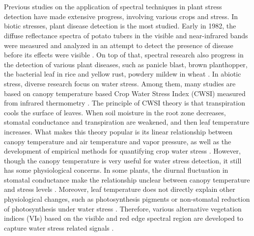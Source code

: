 \documentclass[12pt,a4paper]{article}
\begin{document}
\\
\\
Previous studies on the application of spectral techniques in plant stress detection have made extensive progress, involving various crops and stress. In biotic stresses, plant disease detection is the most studied. Early in 1982, the diffuse reflectance spectra of potato tubers in the visible and near-infrared bands were measured and analyzed in an attempt to detect the presence of disease before its effects were visible \citep{muir1982experiments}. On top of that, spectral research also progress in the detection of various plant diseases, such as panicle blast, brown planthopper, the bacterial leaf in rice \citep{kobayashi2001detection,prasannakumar2013assessment,yang2010assessment} and yellow rust, powdery mildew in wheat \citep{bravo2003early,cao2013detection}. In abiotic stress, diverse research focus on water stress. Among them, many studies are based on canopy temperature based Crop Water Stress Index (CWSI) measured from infrared thermometry \citep{alchanatis2010evaluation,aladenola2014response,bellvert2016airborne}. The principle of CWSI theory is that transpiration cools the surface of leaves. When soil moisture in the root zone decreases, stomatal conductance and transpiration are weakened, and then leaf temperature increases. What makes this theory popular is its linear relationship between canopy temperature and air temperature and vapor pressure, as well as the development of empirical methods for quantifying crop water stress \citep{idso1981normalizing}. However, though the canopy temperature is very useful for water stress detection, it still has some physiological concerns. In some plants, the diurnal fluctuation in stomatal conductance make the relationship unclear between canopy temperature and stress levels \citep{zarco2012fluorescence}. Moreover, leaf temperature does not directly explain other physiological changes, such as photosynthesis pigments or non-stomatal reduction of photosynthesis under water stress \citep{zarco2013pri}. Therefore, various alternative vegetation indices (VIs) based on the visible and red edge spectral region are developed to capture water stress related signals \citep{berni2009thermal,zarco2013pri,wang2015determining,rossini2013assessing,panigada2014fluorescence,dangwal2016monitoring}. 
\\
\\
\end{document}
